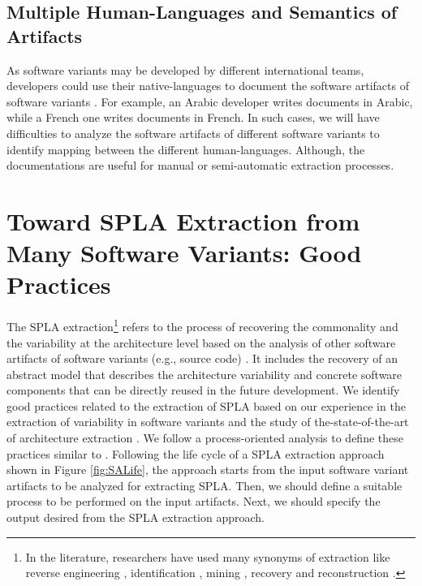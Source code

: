 \documentclass[graybox]{svmult}
\begin{document}
\subsection{Multiple Human-Languages and Semantics of Artifacts}
As software variants may be developed by different international teams, developers could use their native-languages to document the software artifacts of software variants \cite{capiluppi2018national}. For example, an Arabic developer writes documents in Arabic, while a French one writes documents in French. In such cases, we will have difficulties to analyze the software artifacts of different software variants to identify mapping between the different human-languages. Although, the documentations are useful for manual or semi-automatic extraction processes.





\section{Toward SPLA Extraction from Many Software Variants: Good Practices}
\label{sec:extraction-spla}

The SPLA extraction\footnote{In the literature, researchers have used many synonyms of extraction like reverse engineering \cite{shatnawi2017recovering}, identification \cite{mende2009evaluation}, mining \cite{Yuan2014}, recovery \cite{pinzger2004architecture} and reconstruction \cite{moshkenani2012improving}.} refers to the process of recovering the commonality and the variability at the architecture level based on the analysis of other software artifacts of software variants (e.g., source code) \cite{chikofsky1990reverse}. 
It includes the recovery of an abstract model that describes the architecture variability and concrete software components that can be directly reused in the future development.
We identify good practices related to the extraction of SPLA based on our experience in the extraction of variability in software variants and the study of the-state-of-the-art of architecture extraction \cite{ducasse2009software}. 
We follow a process-oriented analysis to define these practices similar to \cite{ducasse2009software}. Following the life cycle of a SPLA extraction approach shown in Figure \ref{fig:SALife}, the approach starts from the input software variant artifacts to be analyzed for extracting SPLA. Then, we should define a suitable process to be performed on the input artifacts. Next, we should specify the output desired from the SPLA extraction approach.
\end{document}
